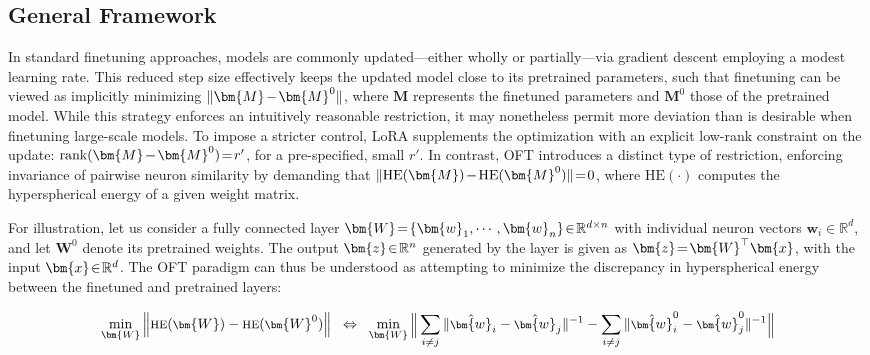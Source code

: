 \subsection{General Framework}

In standard finetuning approaches, models are commonly updated—either wholly or partially—via gradient descent employing a modest learning rate. This reduced step size effectively keeps the updated model close to its pretrained parameters, such that finetuning can be viewed as implicitly minimizing $\thickmuskip=2mu \medmuskip=2mu \| \bm{M} - \bm{M}^0\|$, where $\bm{M}$ represents the finetuned parameters and $\bm{M}^0$ those of the pretrained model. While this strategy enforces an intuitively reasonable restriction, it may nonetheless permit more deviation than is desirable when finetuning large-scale models. To impose a stricter control, LoRA supplements the optimization with an explicit low-rank constraint on the update: $\thickmuskip=2mu \medmuskip=2mu \text{rank}(\bm{M} - \bm{M}^0)=r'$, for a pre-specified, small $r'$. In contrast, OFT introduces a distinct type of restriction, enforcing invariance of pairwise neuron similarity by demanding that $\thickmuskip=2mu \medmuskip=2mu \| \text{HE}(\bm{M})-\text{HE}(\bm{M}^0) \|=0$, where $\text{HE}(\cdot)$ computes the hyperspherical energy of a given weight matrix. 

For illustration, let us consider a fully connected layer $\thickmuskip=2mu \medmuskip=2mu \bm{W}=\{\bm{w}_1,\cdots,\bm{w}_n\}\in\mathbb{R}^{d\times n}$ with individual neuron vectors $\bm{w}_i\in\mathbb{R}^{d}$, and let $\bm{W}^0$ denote its pretrained weights. The output $\thickmuskip=2mu \medmuskip=2mu \bm{z}\in\mathbb{R}^n$ generated by the layer is given as $\thickmuskip=2mu \medmuskip=2mu \bm{z}=\bm{W}^\top\bm{x}$, with the input $\thickmuskip=2mu \medmuskip=2mu \bm{x}\in\mathbb{R}^d$. The OFT paradigm can thus be understood as attempting to minimize the discrepancy in hyperspherical energy between the finetuned and pretrained layers:

\begin{equation}\label{eq:oft_principle}
\footnotesize
\min_{\bm{W}} \left\| \text{HE}(\bm{W})-\text{HE}(\bm{W}^0)\right\|~~\Leftrightarrow~~\min_{\bm{W}} \bigg{\|} \sum_{i\neq j} \|\hat{\bm{w}}_i-\hat{\bm{w}}_j\|^{-1}-\sum_{i\neq j} \|\hat{\bm{w}}^0_i-\hat{\bm{w}}^0_j\|^{-1}\bigg{\|}
\end{equation}

